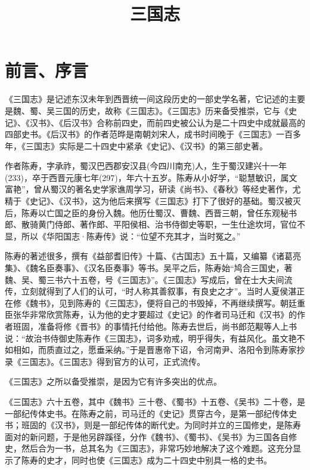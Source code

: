 \documentclass[12pt,UTF8]{ctexbook}
\title{\heiti\zihao{0} 三国志}
\author{}
\date{}
\begin{document}
\maketitle
\tableofcontents

\frontmatter
\chapter{前言、序言}

《三国志》是记述东汉未年到西晋统一间这段历史的一部史学名著，它记述的主要是魏、蜀、吴三国的历史，故称《三国志》。《三国志》历来备受推崇，它与《史记》、《汉书》、《后汉书》合称前四史，而前四史被公认为是二十四史中成就最高的四部史书。《后汉书》的作者范晔是南朝刘宋人，成书时间晚于《三国志》一百多年，《三国志》实际是二十四史中紧承《史记》、《汉书》的第三部史著。

作者陈寿，字承祚，蜀汉巴西郡安汉县(今四川南充)人，生于蜀汉建兴十一年(233)，卒于西晋元康七年(297)，年六十五岁。陈寿从小好学，“聪慧敏识，属文富艳”，曾从蜀汉的著名史学家谯周学习，研读《尚书》、《春秋》等经史著作，尤精于《史记》、《汉书》，这为他后来撰写《三国志》打下了很好的基础。蜀汉被灭后，陈寿以亡国之臣的身份入魏。他历仕蜀汉、曹魏、西晋三朝，曾任东观秘书郎、散骑黄门侍郎、著作郎、平阳侯相、治书侍御史等职，一生仕途坎坷，官位不显，所以《华阳国志·陈寿传》说：“位望不充其才，当时冤之。”

陈寿的著述很多，撰有《益部耆旧传》十篇、《古国志》五十篇，又编纂《诸葛亮集》、《魏名臣奏事》、《汉名臣奏事》等书。吴平之后，陈寿始“鸠合三国史，著魏、吴、蜀三书六十五卷，号《三国志》”。《三国志》写成后，曾在士大夫间流传，立刻就得到了人们的认可，“时人称其善叙事，有良史之才”。当时人夏侯湛正在修《魏书》，见到陈寿的《三国志》，便将自己的书毁掉，不再继续撰写。朝廷重臣张华非常欣赏陈寿，认为他的史才要超过《史记》的作者司马迁和《汉书》的作者班固，准备将修《晋书》的事情托付给他。陈寿去世后，尚书郎范觏等人上书说：“故治书侍御史陈寿作《三国志》，词多劝戒，明乎得失，有益风化。虽文艳不如相如，而质直过之，愿垂采纳。”于是晋惠帝下诏，令河南尹、洛阳令到陈寿家抄录《三国志》。《三国志》得到官方的认可，正式流传。

《三国志》之所以备受推崇，是因为它有许多突出的优点。

《三国志》六十五卷，其中《魏书》三十卷、《蜀书》十五卷、《吴书》二十卷，是一部纪传体史书。在陈寿之前，司马迁的《史记》贯穿古今，是第一部纪传体史书；班固的《汉书》，则是一部纪传体的断代史。为同时并立的三国修史，是陈寿面对的新问题，于是他另辟蹊径，分作《魏书》、《蜀书》、《吴书》为三国各自修史，然后合为一书，总其名为《三国志》，非常巧妙地解决了这个难题。这充分显示了陈寿的史才，同时也使《三国志》成为二十四史中别具一格的史书。
\end{document}

